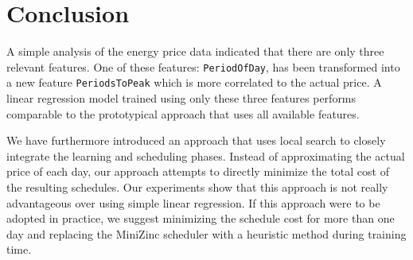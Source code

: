\documentclass{article}
\begin{document}
\section{Conclusion}


A simple analysis of the energy price data indicated that there are only three relevant features. One of these features: \verb+PeriodOfDay+, has been transformed into a new feature \verb+PeriodsToPeak+ which is more correlated to the actual price. A linear regression model trained using only these three features performs comparable to the prototypical approach that uses all available features.

We have furthermore introduced an approach that uses local search to closely integrate the learning and scheduling phases. Instead of approximating the actual price of each day, our approach attempts to directly minimize the total cost of the resulting schedules. Our experiments show that this approach is not really advantageous over using simple linear regression. If this approach were to be adopted in practice, we suggest minimizing the schedule cost for more than one day and replacing the MiniZinc scheduler with a heuristic method during training time. 



\end{document}
